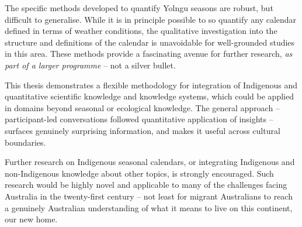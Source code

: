 \clearpage

The specific methods developed to quantify Yolngu seasons are robust, but
difficult to generalise.  While it is in principle possible to so quantify
any calendar defined in terms of weather conditions, the qualitative
investigation into the structure and definitions of the calendar is unavoidable
for well-grounded studies in this area.  These methods provide a fascinating
avenue for further research, \emph{as part of a larger programme} -- not a
silver bullet.

This thesis demonstrates a flexible methodology for integration
of Indigenous and quantitative scientific knowledge and knowledge systems,
which could be applied in domains beyond seasonal or ecological knowledge.
The general approach -- participant-led conversations followed quantitative
application of insights -- surfaces genuinely surprising information, and
makes it useful across cultural boundaries.

Further research on Indigenous seasonal calendars, or integrating Indigenous
and non-Indigenous knowledge about other topics, is strongly encouraged.  Such
research would be highly novel and applicable to many of the challenges facing
Australia in the twenty-first century -- not least for migrant Australians to
reach a genuinely Australian understanding of what it means to live on this
continent, our new home.

